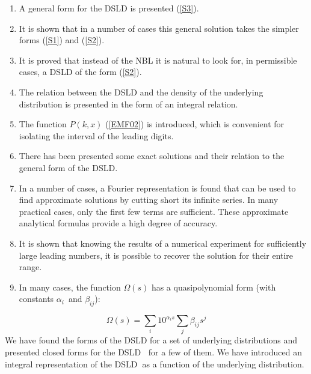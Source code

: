 \documentclass[titlepage,fleqn]{article}%
\begin{document}
\begin{enumerate}
\item A general form for the DSLD is presented (\ref{S3}).

\item It is shown that in a number of cases this general solution takes the
simpler forms (\ref{S1}) and (\ref{S2}).

\item It is proved that instead of the NBL it is natural to look for, in
permissible cases, a DSLD of the form (\ref{S2}).

\item The relation between the DSLD and the density of the underlying
distribution is presented in the form of an integral relation.

\item The function $P(k,x)$ (\ref{EMF02}) is introduced, which is convenient
for isolating the interval of the leading digits.

\item There has been presented some exact solutions and their relation to the
general form of the DSLD.

\item In a number of cases, a Fourier representation is found that can be used
to find approximate solutions by cutting short its infinite series. In many
practical cases, only the first few terms are sufficient. These approximate
analytical formulas provide a high degree of accuracy.

\item It is shown that knowing the results of a numerical experiment for
sufficiently large leading numbers, it is possible to recover the solution for
their entire range.

\item In many cases, the function $\Omega(s)$ has a quasipolynomial form (with
constants $\alpha_{i}$\ and $\beta_{ij}$):
\end{enumerate}

%

\[
\Omega(s)=%
{\displaystyle\sum\limits_{i}}
10^{\alpha_{i}s}%
{\displaystyle\sum\limits_{j}}
\beta_{ij}s^{j}%
\]
We have found the forms of the DSLD for a set of underlying distributions and
presented closed forms for the DSLD\textbf{\ } for a few of them. We have
introduced an integral representation of the DSLD\textbf{\ }as a function of
the underlying distribution.
\end{document}
